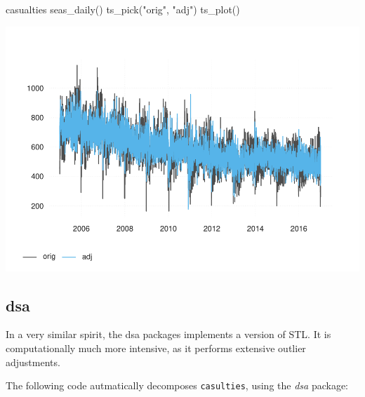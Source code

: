 \begin{Schunk}
\begin{Sinput}
casualties %
  seas_daily() %
  ts_pick("orig", "adj") %
  ts_plot()
\end{Sinput}

\includegraphics[width=1\linewidth]{overview_files/figure-latex/stl-1} \end{Schunk}

\hypertarget{dsa}{%
\subsection{dsa}\label{dsa}}

In a very similar spirit, the dsa packages implements a version of STL.
It is computationally much more intensive, as it performs extensive
outlier adjustments.

The following code autmatically decomposes \texttt{casulties}, using the
\emph{dsa} package:

